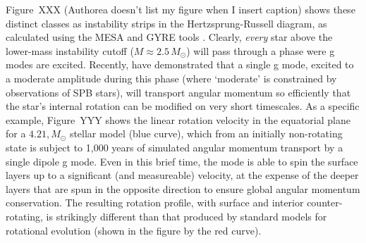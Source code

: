 Figure~XXX (Authorea doesn't list my figure when I insert caption) shows these distinct classes as instability strips in the Hertzsprung-Russell diagram, as calculated using the MESA and GYRE tools \citep[adapted from][]{Paxton2015}. Clearly, \emph{every} star above the lower-mass instability cutoff ($M \approx 2.5\,M_{\odot}$) will pass through a phase were g modes are excited. Recently, \citet{Townsend:2017} have demonstrated that a single g mode, excited to a moderate amplitude during this phase (where `moderate' is constrained by observations of SPB stars), will transport angular momentum so efficiently that the star's internal rotation can be modified on very short timescales. As a specific example, Figure~YYY shows the linear rotation velocity in the equatorial plane for a $4.21,M_{\odot}$ stellar model (blue curve), which from an initially non-rotating state is subject to 1,000 years of simulated angular momentum transport by a single dipole g mode. Even in this brief time, the mode is able to spin the surface layers up to a significant (and measureable) velocity, at the expense of the deeper layers that are spun in the opposite direction to ensure global angular momentum conservation. The resulting rotation profile, with surface and interior counter-rotating, is strikingly different than that produced by standard models for rotational evolution (shown in the figure by the red curve).


